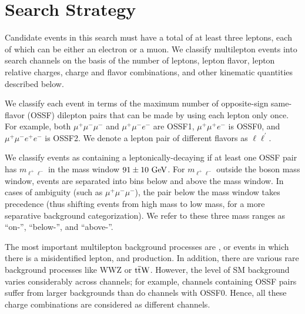 \chapter{Search Strategy}
\label{sec:Strategy}

Candidate events in this search must have a total of at least three leptons, each of which can be either an electron or a muon. We classify multilepton events into search channels on the basis of the number of leptons, lepton flavor, lepton relative charges, charge and flavor combinations, and other kinematic quantities described below.

We classify each event in terms of the maximum number of opposite-sign same-flavor (OSSF) dilepton pairs that can be made by using each lepton only once. For example, both $\mu^+\mu^-\mu^-$ and $\mu^+\mu^-e^-$ are OSSF1, $\mu^+\mu^+e^-$ is OSSF0, and $\mu^+\mu^-e^+e^-$ is OSSF2. We denote a lepton pair of different flavors as $\ell\ell^\prime$.

We classify events as containing a leptonically-decaying \Z if at least one OSSF pair has $m_{\ell^+\ell^-}$ in the \Z mass window $91 \pm 10\,\,\text{Ge\hspace{-.08em}V}$. For $m_{\ell^+\ell^-}$ outside the \Z boson mass window, events are separated into bins below and above the \Z mass window. In cases of ambiguity (such as $\mu^+\mu^-\mu^-$), the pair below the \Z mass window takes precedence (thus shifting events from high mass to low mass, for a more separative background categorization). We refer to these three mass ranges as ``on-\Z'', ``below-\Z'', and ``above-\Z''.

The most important multilepton background processes are \WZ, \Z or \ttbar events in which there is a misidentified lepton, and \ZZ production. In addition, there are various rare background processes like WWZ or $\mathrm{t}\overline{\mathrm{t}}\mathrm{W}$. However, the level of SM background varies considerably across channels; for example, channels containing OSSF pairs suffer from larger backgrounds than do channels with OSSF0. Hence, all these charge combinations are considered as different channels.

